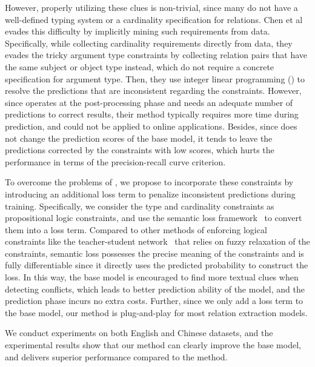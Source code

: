 However, properly utilizing these clues is non-trivial, since many \KBs do not have a well-defined typing system or a cardinality specification for relations.
Chen et al~ evades this difficulty by implicitly mining such requirements from data.
Specifically, while collecting cardinality requirements directly from data, they evades the tricky argument type constraints by collecting relation pairs that have the same subject or object type instead, which do not require a concrete specification for argument type.
Then, they use  integer linear programming (\ILP) to resolve the predictions that are inconsistent regarding the constraints.
However, since \ILP operates at the post-processing phase and needs an adequate number of predictions to correct results, their method typically requires more time during prediction, 
and could not be applied to online applications.
Besides, since \ILP does not change the prediction scores of the base model, it tends to leave the predictions corrected by the constraints with low scores, which hurts the performance in terms of the precision-recall curve criterion.

To overcome the problems of \ILP, we propose to incorporate these constraints by introducing an additional loss term to penalize inconsistent predictions during training.
Specifically, we consider the type and cardinality constraints as propositional logic constraints, and use the semantic loss framework~\cite{xu2017semantic} to convert them into a loss term.
Compared to other methods of enforcing logical constraints like the teacher-student network~\cite{hu2016harnessing} that relies on fuzzy relaxation of the constraints, semantic loss possesses the precise meaning of the constraints and is fully differentiable since it directly uses the predicted probability to construct the loss.
In this way, the base model is encouraged to find more textual clues when detecting conflicts, which leads to better prediction ability of the model, and the prediction phase incurs no extra costs.
Further, since we only add a loss term to the base model, our method is plug-and-play for most relation extraction models.

We conduct experiments on both English and Chinese datasets,
and the experimental results show that our method can clearly improve the base model, and delivers superior performance compared to the \ILP method.


